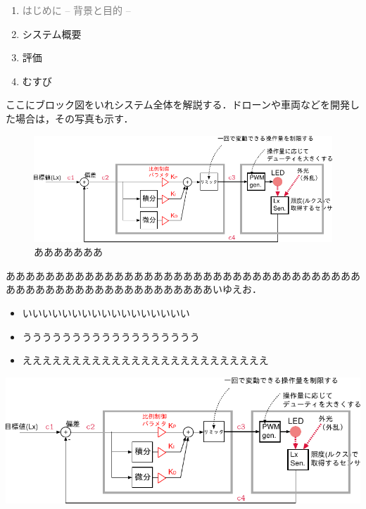 \begin{enumerate}[itemsep=0.25zh]
	\item \textcolor{gray}{はじめに -- 背景と目的 --}
	\item システム概要
	\item 評価
	\item むすび
\end{enumerate}
\newpage


ここにブロック図をいれシステム全体を解説する．ドローンや車両などを開発した場合は，その写真も示す．
\begin{figure}[h]
\begin{center}
\includegraphics[width=\textwidth]{fig/system.pdf}
\caption{あああああああ}
\end{center}
\end{figure}
\newpage

\begin{minipage}[t]{0.4\textwidth}\vspace{0pt}
あああああああああああああああああああああああああああああああああああああああああああああああああああああああああいゆえお．
\begin{itemize}[parsep=-0.5zh]
	\item いいいいいいいいいいいいいいいいい
	\item うううううううううううううううううう
	\item えええええええええええええええええええええええええ
\end{itemize}
\end{minipage}
\begin{minipage}[t]{0.6\textwidth}\vspace{0pt}
\begin{center}
\includegraphics[keepaspectratio, width=.9\linewidth,trim={100mm 0mm 0mm 15mm},clip]{fig/system.pdf}
\end{center}
\end{minipage}

